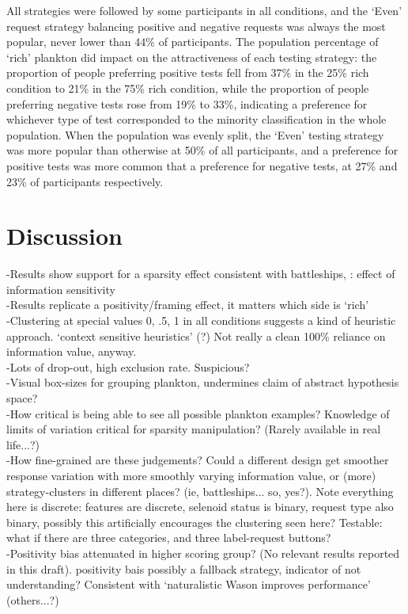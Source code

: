 \documentclass[10pt,letterpaper]{article}
\begin{document}
All strategies were followed by some participants in all conditions, and the `Even' request strategy balancing positive and negative requests was always the most popular, never lower than 44\% of participants. The population percentage of `rich' plankton did impact on the attractiveness of each testing strategy: the proportion of people preferring positive tests fell from 37\% in the 25\% rich condition to 21\% in the 75\% rich condition, while the proportion of people preferring negative tests rose from 19\% to 33\%, indicating a preference for whichever type of test corresponded to the minority classification in the whole population. When the population was evenly split, the `Even' testing strategy was more popular than otherwise at 50\% of all participants, and a preference for positive tests was more common that a preference for negative tests, at 27\% and 23\% of participants respectively.

\section{Discussion}
-Results show support for a sparsity effect consistent with battleships, \cite{navarro2011sparsecat}: effect of information sensitivity\\
-Results replicate a positivity/framing effect, it matters which side is `rich' \\
-Clustering at special values 0, .5, 1 in all conditions suggests a kind of heuristic approach. `context sensitive heuristics' (?) Not really a clean 100\% reliance on information value, anyway.\\

-Lots of drop-out, high exclusion rate. Suspicious?\\
-Visual box-sizes for grouping plankton, undermines claim of abstract hypothesis space?\\
-How critical is being able to see all possible plankton examples? Knowledge of limits of variation critical for sparsity manipulation? (Rarely available in real life...?)\\

-How fine-grained are these judgements? Could a different design get smoother response variation with more smoothly varying information value, or (more) strategy-clusters in different places? (ie, battleships... so, yes?). Note everything here is discrete: features are discrete, selenoid status is binary, request type also binary, possibly this artificially encourages the clustering seen here? Testable: what if there are three categories, and three label-request buttons?\\
-Positivity bias attenuated in higher scoring group? (No relevant results reported in this draft). positivity bais possibly a fallback strategy, indicator of not understanding? Consistent with `naturalistic Wason improves performance' (others...?)\\
\end{document}
